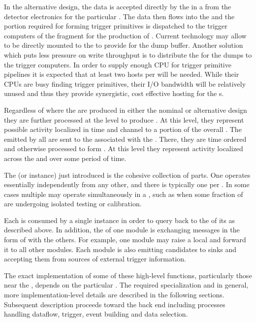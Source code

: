In the alternative design, the data is accepted directly by the
 in a  from the detector electronics
for the particular .
The data then flows into the  and the portion required
for forming trigger primitives is dispatched to the trigger computers
of the fragment for the production of .
Current  technology may allow  to be directly mounted to the
 to provide for the  dump buffer. 
Another solution which puts less pressure on write throughput is to
distribute the  for the  dumps to the trigger computers. 
In order to supply enough CPU for trigger primitive pipelines it is
expected that at least two hosts per  will be needed.
While their CPUs are busy finding trigger primitives, their I/O
bandwidth will be relatively unused and thus they provide synergistic,
cost effective hosting for the s.

Regardless of where the  are produced in either
the nominal or alternative design they are further processed at the
 level to produce . 
At this level, they represent possible activity localized in time and
channel to a portion of the overall .
The  emitted by all  are sent to
the  associated with the .
There, they are time ordered and otherwise processed to form
.
At this level they represent activity localized across the
 and over some period of time.

The  (or  instance) just introduced is the cohesive
collection of  parts. 
One  operates essentially independently from any other,
and there is typically one per . 
In some cases multiple  may operate simultaneously in
a , such as when some fraction of 
are undergoing isolated testing or calibration.

Each  is consumed by a single  instance
in order to query back to the  of its 
as described above.
In addition, the  of one module is exchanging messages in
the form of  with the others. 
For example, one module may raise a local 
 and forward it to all other modules.
Each module is also emitting candidates to sinks and accepting them
from sources of external trigger information.

The exact implementation of some of these high-level functions,
particularly those near the , depends on the particular
. 
The required specialization and in general, more implementation-level
details are described in the following sections.
Subsequent description proceeds toward the  back end including
processes handling dataflow, trigger, event building and data
selection.

